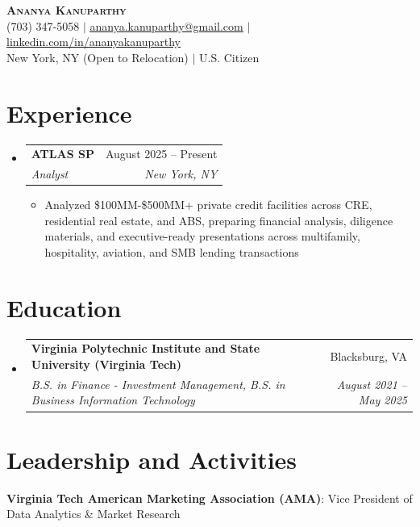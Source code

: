 \documentclass[letterpaper,11pt]{article}
\makeatletter
\newcommand{\resumeItem}[1]{
  \item\small{{#1 \vspace{-2pt}}}
}
\newcommand{\resumeSubheading}[4]{
  \vspace{-2pt}\item
  \begin{tabular*}{0.97\textwidth}[t]{l@{\extracolsep{\fill}}r}
    \textbf{#1} & #2 \\
    \textit{\small#3} & \textit{\small #4} \\
  \end{tabular*}\vspace{-7pt}
}
\newcommand{\resumeSubHeadingListStart}{
  \begin{itemize}[leftmargin=0.15in, label={}]
}
\newcommand{\resumeSubHeadingListEnd}{
  \end{itemize}
}
\newcommand{\resumeItemListStart}{
  \begin{itemize}[leftmargin=*, label=\textbullet]
}
\newcommand{\resumeItemListEnd}{
  \end{itemize}\vspace{-5pt}
}
\makeatother
\begin{document}

\begin{center}
    \textbf{\Huge \scshape Ananya Kanuparthy} \\ \vspace{1pt}
    \small
    (703) 347-5058 $|$
    \href{mailto:ananya.kanuparthy@gmail.com}{\underline{ananya.kanuparthy@gmail.com}} $|$
    \href{https://linkedin.com/in/ananyakanuparthy}{\underline{linkedin.com/in/ananyakanuparthy}} \\
    New York, NY (Open to Relocation) $|$
    U.S. Citizen
\end{center}

\section{Experience}

\resumeSubHeadingListStart

\resumeSubheading
{ATLAS SP}
{August 2025 -- Present}
{Analyst}
{New York, NY}

\resumeItemListStart

\resumeItem{Analyzed \$100MM-\$500MM+ private credit facilities across CRE, residential real estate, and ABS, preparing financial analysis, diligence materials, and executive-ready presentations across multifamily, hospitality, aviation, and SMB lending transactions}

\resumeItemListEnd

\resumeSubHeadingListEnd

\section{Education}

\resumeSubHeadingListStart

\resumeSubheading
{Virginia Polytechnic Institute and State University (Virginia Tech)}
{Blacksburg, VA}
{B.S. in Finance - Investment Management, B.S. in Business Information Technology}
{August 2021 -- May 2025}

\resumeSubHeadingListEnd

\section{Leadership and Activities}
    \begin{itemize}[leftmargin=0.15in, label={}]
        \small{\item{
            \textbf{Virginia Tech American Marketing Association (AMA)}{: Vice President of Data Analytics \& Market Research} \\
        }}
    \end{itemize}
\end{document}

